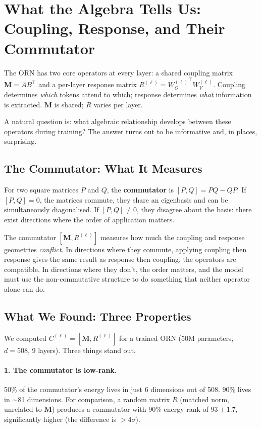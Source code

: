\documentclass[11pt, a4paper]{article}
\newcommand{\M}{\mathbf{M}}
\theoremstyle{remark}
\begin{document}
\section{What the Algebra Tells Us: Coupling, Response, and Their Commutator}
\label{sec:algebra}

The ORN has two core operators at every layer: a shared coupling matrix $\M = AB^\top$ and a per-layer response matrix $R^{(\ell)} = {W_O^{(\ell)}}^\top W_V^{(\ell)}$.
Coupling determines \emph{which} tokens attend to which; response determines \emph{what} information is extracted.
$\M$ is shared; $R$ varies per layer.

A natural question is: what algebraic relationship develops between these operators during training?
The answer turns out to be informative and, in places, surprising.

\subsection{The Commutator: What It Measures}

For two square matrices $P$ and $Q$, the \textbf{commutator} is $[P, Q] = PQ - QP$.
If $[P, Q] = 0$, the matrices commute, they share an eigenbasis and can be simultaneously diagonalised.
If $[P, Q] \neq 0$, they disagree about the basis: there exist directions where the order of application matters.

The commutator $[\M, R^{(\ell)}]$ measures how much the coupling and response geometries \emph{conflict}.
In directions where they commute, applying coupling then response gives the same result as response then coupling, the operators are compatible.
In directions where they don't, the order matters, and the model must use the non-commutative structure to do something that neither operator alone can do.

\subsection{What We Found: Three Properties}

We computed $C^{(\ell)} = [\M, R^{(\ell)}]$ for a trained ORN (50M parameters, $d = 508$, 9 layers).
Three things stand out.

\paragraph{1. The commutator is low-rank.}
50\% of the commutator's energy lives in just 6 dimensions out of 508.
90\% lives in $\sim$81 dimensions.
For comparison, a random matrix $R$ (matched norm, unrelated to $\M$) produces a commutator with 90\%-energy rank of $93 \pm 1.7$, significantly higher (the difference is $>4\sigma$).
\end{document}
